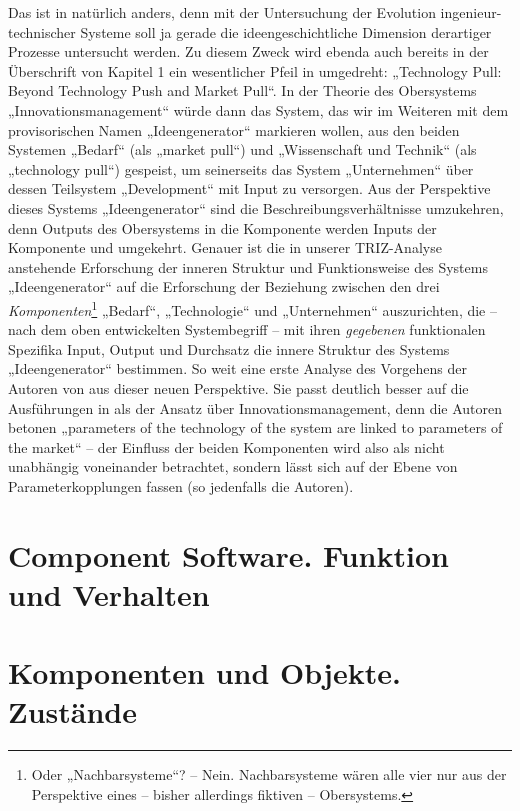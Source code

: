 \documentclass[11pt,a4paper]{article}
\begin{document}
Das ist in \cite{TESE2018} natürlich anders, denn mit der Untersuchung der
Evolution ingenieur-technischer Systeme soll ja gerade die ideengeschichtliche
Dimension derartiger Prozesse untersucht werden.  Zu diesem Zweck wird ebenda
auch bereits in der Überschrift von Kapitel 1 ein wesentlicher Pfeil in
\cite[fig. 3]{Preez2006} umgedreht: „Technology Pull: Beyond Technology Push
and Market Pull“.  In der Theorie des Obersystems „Innovationsmanagement“
würde dann das System, das wir im Weiteren mit dem provisorischen Namen
„Ideengenerator“ markieren wollen, aus den beiden Systemen „Bedarf“ (als
„market pull“) und „Wissenschaft und Technik“ (als „technology pull“)
gespeist, um seinerseits das System „Unternehmen“ über dessen Teilsystem
„Development“ mit Input zu versorgen. Aus der Perspektive dieses Systems
„Ideengenerator“ sind die Beschreibungsverhältnisse umzukehren, denn Outputs
des Obersystems in die Komponente werden Inputs der Komponente und umgekehrt.
Genauer ist die in unserer TRIZ-Analyse anstehende Erforschung der inneren
Struktur und Funktionsweise des Systems „Ideengenerator“ auf die Erforschung
der Beziehung zwischen den drei \emph{Komponenten}\footnote{Oder
  „Nachbarsysteme“? -- Nein. Nachbarsysteme wären alle vier nur aus der
  Perspektive eines -- bisher allerdings fiktiven -- Obersystems.} „Bedarf“,
„Technologie“ und „Unternehmen“ auszurichten, die -- nach dem oben
entwickelten Systembegriff -- mit ihren \emph{gegebenen} funktionalen
Spezifika Input, Output und Durchsatz die innere Struktur des Systems
„Ideengenerator“ bestimmen. So weit eine erste Analyse des Vorgehens der
Autoren von \cite{TESE2018} aus dieser neuen Perspektive. Sie passt deutlich
besser auf die Ausführungen in \cite[Kap. 1]{TESE2018} als der Ansatz über
Innovationsmanagement, denn die Autoren betonen „parameters of the technology
of the system are linked to parameters of the market“ -- der Einfluss der
beiden Komponenten wird also als nicht unabhängig voneinander betrachtet,
sondern lässt sich auf der Ebene von Parameterkopplungen fassen (so jedenfalls
die Autoren).

\section{Component Software. Funktion und Verhalten}

\section{Komponenten und Objekte. Zustände}
\end{document}
